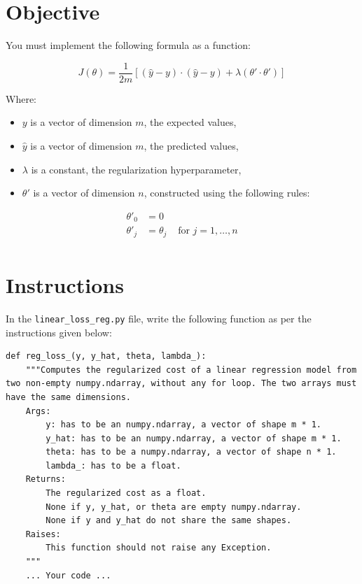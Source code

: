 \documentclass{42-en}
\begin{document}
\section*{Objective}
You must implement the following formula as a function:  

$$
J(\theta)  =  \frac{1}{2m}[(\hat{y} - y)\cdot(\hat{y} - y) + \lambda (\theta' \cdot \theta')]
$$  

Where:
\begin{itemize}
  \item $y$ is a vector of dimension $m$, the expected values,
  \item $\hat{y}$ is a vector of dimension $m$, the predicted values,
  \item $\lambda$ is a constant, the regularization hyperparameter,
  \item $\theta'$ is a vector of dimension $n$, constructed using the following rules:
\end{itemize}
  
$$
\begin{matrix}
\theta'_0 & =  0 \\
\theta'_j & =  \theta_j & \text{ for } j = 1, \dots, n\\
\end{matrix}
$$

\section*{Instructions}
In the \texttt{linear\_loss\_reg.py} file, write the following function as per the instructions given below:

\begin{verbatim}
def reg_loss_(y, y_hat, theta, lambda_):
	"""Computes the regularized cost of a linear regression model from two non-empty numpy.ndarray, without any for loop. The two arrays must have the same dimensions.
	Args:
		y: has to be an numpy.ndarray, a vector of shape m * 1.
		y_hat: has to be an numpy.ndarray, a vector of shape m * 1.
		theta: has to be a numpy.ndarray, a vector of shape n * 1.
		lambda_: has to be a float.
	Returns:
		The regularized cost as a float.
		None if y, y_hat, or theta are empty numpy.ndarray.
		None if y and y_hat do not share the same shapes.
	Raises:
		This function should not raise any Exception.
	"""
	... Your code ...
\end{verbatim}
\end{document}
